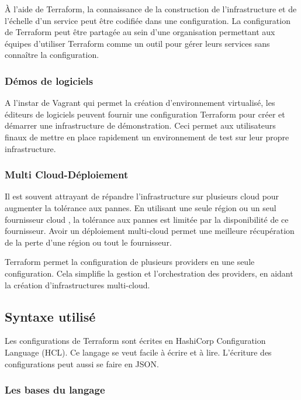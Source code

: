 \documentclass[]{article}
\begin{document}
À l'aide de Terraform, la connaissance de la construction de
l'infrastructure et de l'échelle d'un service peut être codifiée dans
une configuration. La configuration de Terraform peut être partagée au
sein d'une organisation permettant aux équipes d'utiliser Terraform
comme un outil pour gérer leurs services sans connaître la
configuration.

\subsubsection{Démos de logiciels}\label{duxe9mos-de-logiciels}

A l'instar de Vagrant qui permet la création d'environnement virtualisé,
les éditeurs de logiciels peuvent fournir une configuration Terraform
pour créer et démarrer une infrastructure de démonstration. Ceci permet
aux utilisateurs finaux de mettre en place rapidement un environnement
de test sur leur propre infrastructure.

\subsubsection{Multi
Cloud-Déploiement}\label{multi-cloud-duxe9ploiement}

Il est souvent attrayant de répandre l'infrastructure sur plusieurs
cloud pour augmenter la tolérance aux pannes. En utilisant une seule
région ou un seul fournisseur cloud , la tolérance aux pannes est
limitée par la disponibilité de ce fournisseur. Avoir un déploiement
multi-cloud permet une meilleure récupération de la perte d'une région
ou tout le fournisseur.

Terraform permet la configuration de plusieurs providers en une seule
configuration. Cela simplifie la gestion et l'orchestration des
providers, en aidant la création d'infrastructures multi-cloud.

\subsection{Syntaxe utilisé}\label{syntaxe-utilisuxe9}

Les configurations de Terraform sont écrites en HashiCorp Configuration
Language (HCL). Ce langage se veut facile à écrire et à lire. L'écriture
des configurations peut aussi se faire en JSON.

\subsubsection{Les bases du langage}\label{les-bases-du-langage}
\end{document}
